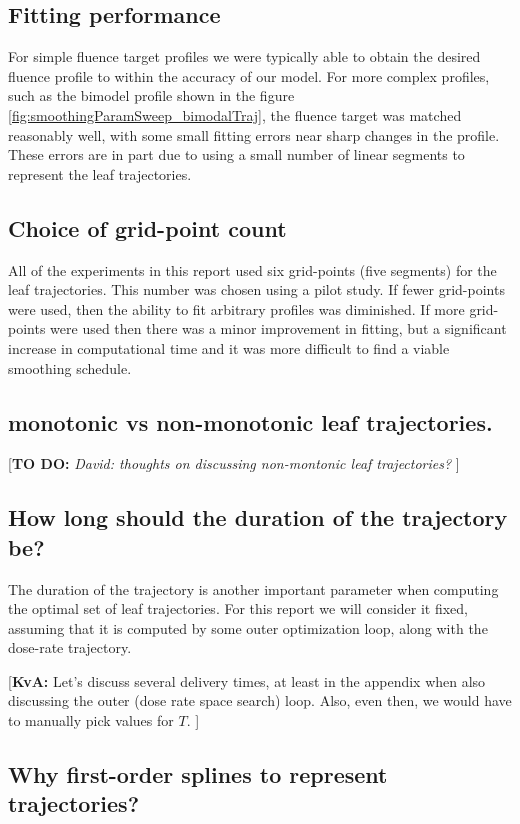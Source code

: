 \documentclass{iopart}
\newcommand{\todo}[1]{{\color{lightblue}\par {[{\bf TO DO: } {\em #1}} ] \\    }}
\newcommand{\KvAcomment}[1]{{\color{magenta}\par {[{\bf KvA: } { #1}} ] \\    }}
\begin{document}
\subsection{Fitting performance}

For simple fluence target profiles we were typically able to obtain the desired fluence profile to within the accuracy of our model. For more complex profiles, such as the bimodel profile shown in the figure \ref{fig:smoothingParamSweep_bimodalTraj}, the fluence target was matched reasonably well, with some small fitting errors near sharp changes in the profile. These errors are in part due to using a small number of linear segments to represent the leaf trajectories.

\subsection{Choice of grid-point count}

All of the experiments in this report used six grid-points (five segments) for the leaf trajectories. This number was chosen using a pilot study. If fewer grid-points were used, then the ability to fit arbitrary profiles was diminished. If more grid-points were used then there was a minor improvement in fitting, but a significant increase in computational time and it was more difficult to find a viable smoothing schedule.

\subsection{monotonic vs non-monotonic leaf trajectories.}

\todo{David: thoughts on discussing non-montonic leaf trajectories?}


\subsection{How long should the duration of the trajectory be?}

The duration of the trajectory is another important parameter when computing the optimal set of leaf trajectories. For this report we will consider it fixed, assuming that it is computed by some outer optimization loop, along with the dose-rate trajectory.
\KvAcomment{Let's discuss several delivery times, at least in the appendix when also discussing the outer (dose rate space search) loop. Also, even then, we would have to manually pick values for $T$.}

\subsection{Why first-order splines to represent trajectories?}
\label{sec:WhyUseLinearSplines}
\end{document}
